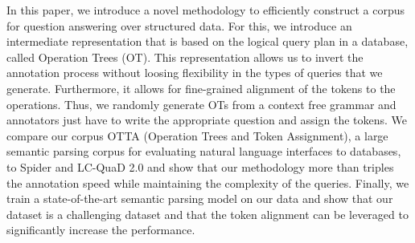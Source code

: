 In this paper, we introduce a novel methodology to efficiently construct a corpus for question answering over structured data. For this, we introduce an intermediate representation that is based on the logical query plan in a database, called Operation Trees (OT). This representation allows us to invert the annotation process without loosing flexibility in the types of queries that we generate. Furthermore, it allows for fine-grained alignment of the tokens to the operations. Thus, we randomly generate OTs from a context free grammar and annotators just have to write the appropriate question and assign the tokens. We compare our corpus OTTA (Operation Trees and Token Assignment), a large semantic parsing corpus for evaluating natural language interfaces to databases, to Spider and LC-QuaD 2.0 and show that our methodology more than triples the annotation speed while maintaining the complexity of the queries. Finally, we train a state-of-the-art semantic parsing model on our data and show that our dataset is a challenging dataset and that the token alignment can be leveraged to significantly increase the performance.
